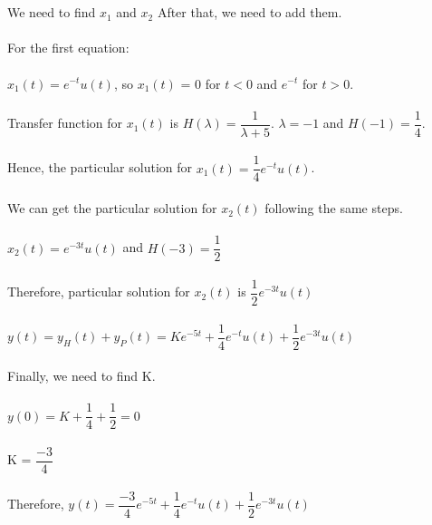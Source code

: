 \documentclass[10pt,a4paper, margin=1in]{article}
\begin{document}
\begin{enumerate}
\begin{enumerate}
        \\\\ We need to find $x_{1} $ and $x_{2}$ After that, we need to add them.
        \\\\ For the first equation:
        \\\\ \hspace*{50} $x_{1}(t) = e^{-t}u(t)$, so $x_{1}(t)$ = 0 for $t<0$ and $e^{-t}$ for $t>0$.
        \\\\ Transfer function for $x_{1}(t)$ is $H(\lambda) = \dfrac{1}{\lambda+5}$. $\lambda = -1$ and $H(-1) = \dfrac{1}{4}$. 
        \\\\ Hence, the particular solution for $x_{1}(t) = \dfrac{1}{4}e^{-t}u(t)$.
        \\\\ We can get the particular solution for $x_{2}(t)$ following the same steps.
        \\\\ \hspace*{50} $x_{2}(t) = e^{-3t}u(t)$ and $H(-3) = \dfrac{1}{2}$
        \\\\ Therefore, particular solution for $x_{2}(t)$ is $\dfrac{1}{2}e^{-3t}u(t)$
        \\\\ \hspace*{50} $y(t) = y_{H}(t) + y_{P}(t) = Ke^{-5t} + \dfrac{1}{4}e^{-t}u(t) +  \dfrac{1}{2}e^{-3t}u(t)$
        \\\\ Finally, we need to find K.
        \\\\ \hspace*{50} $y(0) = K +\dfrac{1}{4}+\dfrac{1}{2} = 0 $
        \\\\ \hspace*{50}  K = $\dfrac{-3}{4}$
        \\\\ Therefore, $y(t) = \dfrac{-3}{4}e^{-5t} + \dfrac{1}{4}e^{-t}u(t) +  \dfrac{1}{2}e^{-3t}u(t)$
    \end{enumerate}


\end{enumerate}
\end{document}

